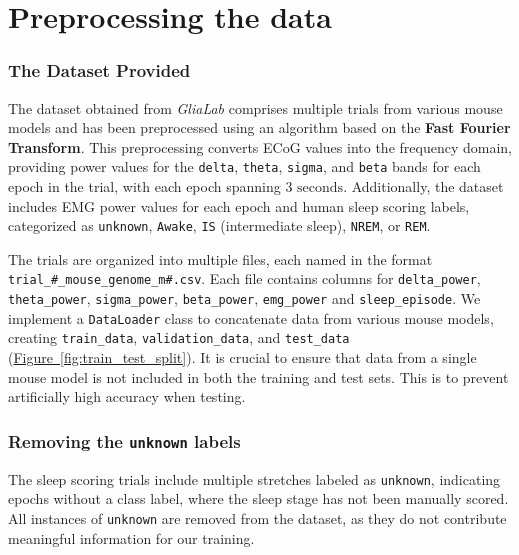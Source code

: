 \documentclass{article}
\begin{document}
\section*{Preprocessing the data}
\begin{multicols}{2}
\subsubsection*{The Dataset Provided}
The dataset obtained from \textit{GliaLab} comprises multiple trials from various mouse models and has been preprocessed using an algorithm based on the \textbf{Fast Fourier Transform}. This preprocessing converts ECoG values into the frequency domain, providing power values for the \texttt{delta}, \texttt{theta}, \texttt{sigma}, and \texttt{beta} bands for each epoch in the trial, with each epoch spanning $3 \text{ seconds}$. Additionally, the dataset includes EMG power values for each epoch and human sleep scoring labels, categorized as \texttt{unknown}, \texttt{Awake}, \texttt{IS} (intermediate sleep), \texttt{NREM}, or \texttt{REM}.

The trials are organized into multiple files, each named in the format \texttt{trial\_\#\_mouse\_genome\_m\#.csv}. Each file contains columns for \texttt{delta\_power}, \texttt{theta\_power}, \texttt{sigma\_power}, \texttt{beta\_power}, \texttt{emg\_power} and \texttt{sleep\_episode}. We implement a \texttt{DataLoader} class to concatenate data from various mouse models, creating \texttt{train\_data}, \texttt{validation\_data}, and \texttt{test\_data} (\hyperref[fig:train_test_split]{Figure~\ref*{fig:train_test_split}}). It is crucial to ensure that data from a single mouse model is not included in both the training and test sets. This is to prevent artificially high accuracy when testing.

\subsubsection*{Removing the \texttt{unknown} labels}
The sleep scoring trials include multiple stretches labeled as \texttt{unknown}, indicating epochs without a class label, where the sleep stage has not been manually scored. All instances of \texttt{unknown} are removed from the dataset, as they do not contribute meaningful information for our training.


\end{multicols}
\end{document}
